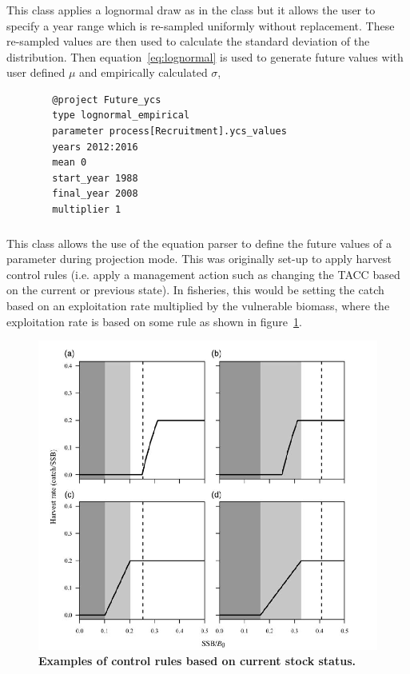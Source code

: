 \subsubsection[Lognormal-Empirical]{}

This class applies a lognormal draw as in the  class but it allows the user to specify a year range which is re-sampled uniformly without replacement. These re-sampled values are then used to calculate the standard deviation of the distribution. Then equation~\eqref{eq:lognormal} is used to generate future values with user defined $\mu$ and empirically calculated $\sigma$,

{\small{\begin{verbatim}
		@project Future_ycs
		type lognormal_empirical
		parameter process[Recruitment].ycs_values
		years 2012:2016
		mean 0
		start_year 1988
		final_year 2008
		multiplier 1
		\end{verbatim}}}

\subsubsection[User Defined]{}

This class allows the use of the equation parser to define the future values of a parameter during projection mode. This was originally set-up to apply harvest control rules (i.e. apply a management action such as changing the TACC based on the current or previous state). In fisheries, this would be setting the catch based on an exploitation rate multiplied by the vulnerable biomass, where the exploitation rate is based on some rule as shown in figure~\ref{fig:HCR}.

\begin{figure}[!h]
	\includegraphics[scale=0.9]{Figures/HarvestControlRules.png}
	\caption{\textbf{Examples of control rules based on current stock status.}}
	\label{fig:HCR}
\end{figure}

